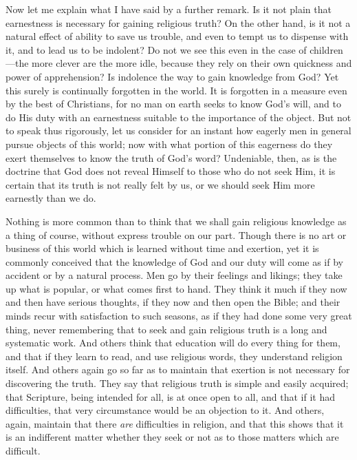 Now let me explain what I have said by a further remark. Is it not
plain that earnestness is necessary for gaining religious truth? On
the other hand, is it not a natural effect of ability to save us
trouble, and even to tempt us to dispense with it, and to lead us to
be indolent? Do not we see this even in the case of children—the
more clever are the more idle, because they rely on their own
quickness and power of apprehension? Is indolence the way to gain
knowledge from God? Yet this surely is continually forgotten in the
world. It is forgotten in a measure even by the best of Christians,
for no man on earth seeks to know God's will, and to do His duty with
an earnestness suitable to the importance of the object. But not to
speak thus rigorously, let us consider for an instant how eagerly men
in general pursue objects of this world; now with what portion of this
eagerness do they exert themselves to know the truth of God's word?
Undeniable, then, as is the doctrine that God does not reveal Himself
to those who do not seek Him, it is certain that its truth is not
really felt by us, or we should seek Him more earnestly than we do.

Nothing is more common than to think that we shall gain religious
knowledge as a thing of course, without express trouble on our part.
Though there is no art or business of this world which is learned
without time and exertion, yet it is commonly conceived that the
knowledge of God and our duty will come as if by accident or by a
natural process. Men go by their feelings and likings; they take up
what is popular, or what comes first to hand. They think it much if
they now and then have serious thoughts, if they now and then open the
Bible; and their minds recur with satisfaction to such seasons, as if
they had done some very great thing, never remembering that to seek
and gain religious truth is a long and systematic work. And others
think that education will do every thing for them, and that if they
learn to read, and use religious words, they understand religion
itself. And others again go so far as to maintain that exertion is not
necessary for discovering the truth. They say that religious truth is
simple and easily acquired; that Scripture, being intended for all, is
at once open to all, and that if it had difficulties, that very
circumstance would be an objection to it. And others, again, maintain
that there \emph{are} difficulties in religion, and that this shows
that it is an indifferent matter whether they seek or not as to those
matters which are difficult.

